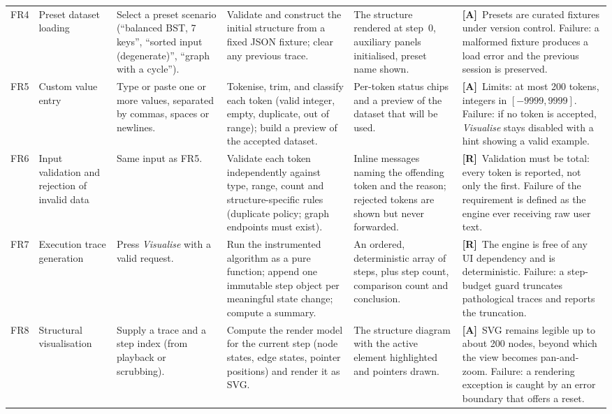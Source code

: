 \documentclass[11pt,a4paper]{article}
\newcommand{\R}{\textcolor{reqc}{\textbf{[R]}}}     %
\newcommand{\A}{\textcolor{asmc}{\textbf{[A]}}}     %
\begin{document}
{\begin{longtable}{@{}L{0.9cm}L{2.4cm}L{3.0cm}L{3.6cm}L{2.6cm}L{2.4cm}@{}}
FR4 & Preset dataset loading &
Select a preset scenario (``balanced BST, 7 keys'', ``sorted input (degenerate)'',
``graph with a cycle''). &
Validate and construct the initial structure from a fixed JSON fixture; clear any previous
trace. &
The structure rendered at step~0, auxiliary panels initialised, preset name shown. &
\A\ Presets are curated fixtures under version control. Failure: a malformed fixture
produces a load error and the previous session is preserved. \\

FR5 & Custom value entry &
Type or paste one or more values, separated by commas, spaces or newlines. &
Tokenise, trim, and classify each token (valid integer, empty, duplicate, out of range);
build a preview of the accepted dataset. &
Per-token status chips and a preview of the dataset that will be used. &
\A\ Limits: at most 200 tokens, integers in $[-9999, 9999]$. Failure: if no token is
accepted, \emph{Visualise} stays disabled with a hint showing a valid example. \\

FR6 & Input validation and rejection of invalid data &
Same input as FR5. &
Validate each token independently against type, range, count and structure-specific rules
(duplicate policy; graph endpoints must exist). &
Inline messages naming the offending token and the reason; rejected tokens are shown but
never forwarded. &
\R\ Validation must be total: every token is reported, not only the first. Failure of the
requirement is defined as the engine ever receiving raw user text. \\

FR7 & Execution trace generation &
Press \emph{Visualise} with a valid request. &
Run the instrumented algorithm as a pure function; append one immutable step object per
meaningful state change; compute a summary. &
An ordered, deterministic array of steps, plus step count, comparison count and conclusion. &
\R\ The engine is free of any UI dependency and is deterministic. Failure: a step-budget
guard truncates pathological traces and reports the truncation. \\

FR8 & Structural visualisation &
Supply a trace and a step index (from playback or scrubbing). &
Compute the render model for the current step (node states, edge states, pointer positions)
and render it as SVG. &
The structure diagram with the active element highlighted and pointers drawn. &
\A\ SVG remains legible up to about 200 nodes, beyond which the view becomes
pan-and-zoom. Failure: a rendering exception is caught by an error boundary that offers a
reset. \\


\end{longtable}}
\end{document}
